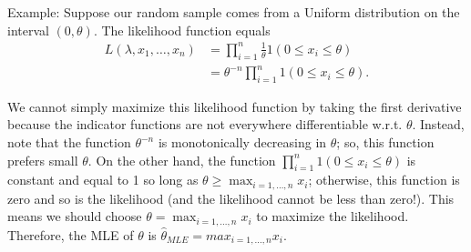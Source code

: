 \documentclass[
]{book}
\begin{document}
Example: Suppose our random sample comes from a Uniform distribution on the interval \((0,\theta)\). The likelihood function equals
\begin{align*}
L(\lambda, x_1, \ldots, x_n) &= \prod_{i=1}^n \frac{1}{\theta}1(0\leq x_i\leq \theta) \\
& = \theta^{-n}\prod_{i=1}^n 1(0\leq x_i\leq \theta).
\end{align*}

We cannot simply maximize this likelihood function by taking the first derivative because the indicator functions are not everywhere differentiable w.r.t. \(\theta\). Instead, note that the function \(\theta^{-n}\) is monotonically decreasing in \(\theta\); so, this function prefers small \(\theta\). On the other hand, the function \(\prod_{i=1}^n 1(0\leq x_i\leq \theta)\) is constant and equal to 1 so long as \(\theta \geq \max_{i=1, \ldots, n} x_i\); otherwise, this function is zero and so is the likelihood (and the likelihood cannot be less than zero!). This means we should choose \(\theta = \max_{i=1, \ldots, n} x_i\) to maximize the likelihood. Therefore, the MLE of \(\theta\) is \(\hat\theta_{MLE} = max_{i=1, \ldots, n} x_i\).
\end{document}

